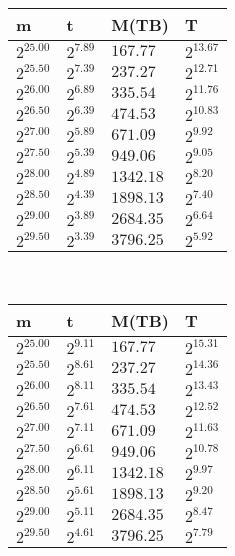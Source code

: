 \begin{tabular}{llll}
m & t & M(TB) & T \\ \hline
$2^{25.00}$ & $2^{7.89}$ & $167.77$ & $2^{13.67}$ \\
$2^{25.50}$ & $2^{7.39}$ & $237.27$ & $2^{12.71}$ \\
$2^{26.00}$ & $2^{6.89}$ & $335.54$ & $2^{11.76}$ \\
$2^{26.50}$ & $2^{6.39}$ & $474.53$ & $2^{10.83}$ \\
$2^{27.00}$ & $2^{5.89}$ & $671.09$ & $2^{9.92}$ \\
$2^{27.50}$ & $2^{5.39}$ & $949.06$ & $2^{9.05}$ \\
$2^{28.00}$ & $2^{4.89}$ & $1342.18$ & $2^{8.20}$ \\
$2^{28.50}$ & $2^{4.39}$ & $1898.13$ & $2^{7.40}$ \\
$2^{29.00}$ & $2^{3.89}$ & $2684.35$ & $2^{6.64}$ \\
$2^{29.50}$ & $2^{3.39}$ & $3796.25$ & $2^{5.92}$ \\
\end{tabular}
 \ 
\begin{tabular}{llll}
m & t & M(TB) & T \\ \hline
$2^{25.00}$ & $2^{9.11}$ & $167.77$ & $2^{15.31}$ \\
$2^{25.50}$ & $2^{8.61}$ & $237.27$ & $2^{14.36}$ \\
$2^{26.00}$ & $2^{8.11}$ & $335.54$ & $2^{13.43}$ \\
$2^{26.50}$ & $2^{7.61}$ & $474.53$ & $2^{12.52}$ \\
$2^{27.00}$ & $2^{7.11}$ & $671.09$ & $2^{11.63}$ \\
$2^{27.50}$ & $2^{6.61}$ & $949.06$ & $2^{10.78}$ \\
$2^{28.00}$ & $2^{6.11}$ & $1342.18$ & $2^{9.97}$ \\
$2^{28.50}$ & $2^{5.61}$ & $1898.13$ & $2^{9.20}$ \\
$2^{29.00}$ & $2^{5.11}$ & $2684.35$ & $2^{8.47}$ \\
$2^{29.50}$ & $2^{4.61}$ & $3796.25$ & $2^{7.79}$ \\
\end{tabular}
 \ 
